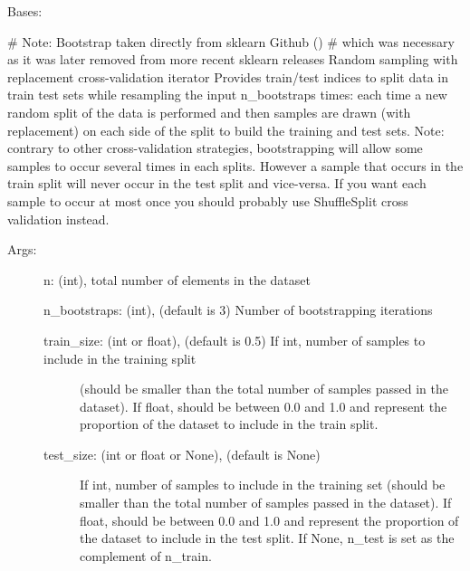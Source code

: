 \documentclass[letterpaper,10pt,english]{sphinxmanual}
\begin{document}
\begin{fulllineitems}
\label{\detokenize{api/mastml.data_splitters.Bootstrap:mastml.data_splitters.Bootstrap}}
Bases: {\hyperref[\detokenize{api/mastml.data_splitters.BaseSplitter:mastml.data_splitters.BaseSplitter}]{}}

\# Note: Bootstrap taken directly from sklearn Github ()
\# which was necessary as it was later removed from more recent sklearn releases
Random sampling with replacement cross-validation iterator
Provides train/test indices to split data in train test sets
while resampling the input n\_bootstraps times: each time a new
random split of the data is performed and then samples are drawn
(with replacement) on each side of the split to build the training
and test sets.
Note: contrary to other cross-validation strategies, bootstrapping
will allow some samples to occur several times in each splits. However
a sample that occurs in the train split will never occur in the test
split and vice-versa.
If you want each sample to occur at most once you should probably
use ShuffleSplit cross validation instead.
\begin{description}
\item[{Args:}] \leavevmode
n: (int), total number of elements in the dataset

n\_bootstraps: (int), (default is 3) Number of bootstrapping iterations
\begin{description}
\item[{train\_size: (int or float), (default is 0.5) If int, number of samples to include in the training split}] \leavevmode
(should be smaller than the total number of samples passed in the dataset).
If float, should be between 0.0 and 1.0 and represent the
proportion of the dataset to include in the train split.

\item[{test\_size: (int or float or None), (default is None)}] \leavevmode
If int, number of samples to include in the training set
(should be smaller than the total number of samples passed
in the dataset).
If float, should be between 0.0 and 1.0 and represent the
proportion of the dataset to include in the test split.
If None, n\_test is set as the complement of n\_train.


\end{description}
\end{description}
\end{fulllineitems}
\end{document}
